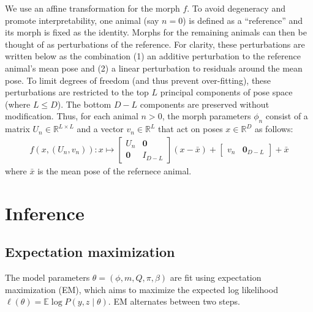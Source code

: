 \documentclass{article}         %
\newcommand{\EE}{\mathbb{E}}
\begin{document}
We use an affine transformation for the morph $f$. To avoid degeneracy and promote interpretability, one animal (say $n=0$) is defined as a ``reference'' and its morph is fixed as the identity. Morphs for the remaining animals can then be thought of as perturbations of the reference. For clarity, these perturbations are written below as the combination (1) an additive perturbation to the reference animal's mean pose and (2) a linear perturbation to residuals around the mean pose. To limit degrees of freedom (and thus prevent over-fitting), these perturbations are restricted to the top $L$ principal components of pose space (where $L \le D$). The bottom $D-L$ components are preserved without modification. Thus, for each animal $n > 0$, the morph parameters $\phi_n$ consist of a matrix $U_n \in \mathbb{R}^{L \times L}$ and a vector $v_n \in \mathbb{R}^L$ that act on poses $x \in \mathbb{R}^D$ as follows:
%
\begin{align}
    f(x, (U_n, v_n)): x \mapsto 
    \begin{bmatrix} U_n & \mathbf{0} \\ \mathbf{0} & I_{D-L} \end{bmatrix}
    (x - \bar{x}) + 
    \begin{bmatrix} v_n & \mathbf{0}_{D-L}\end{bmatrix} + \bar{x}
\end{align}
%
where $\bar{x}$ is the mean pose of the refernece animal.

\section{Inference}

\subsection{Expectation maximization}
\label{sec:em-general}

The model parameters $\theta = (\phi, m, Q, \pi, \beta)$ are fit using expectation maximization (EM), which aims to maximize the expected log likelihood $\ell(\theta) = \EE \log P(y, z \mid \theta)$. EM alternates between two steps.


\end{document}
